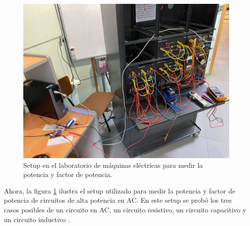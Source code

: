 \begin{figure}[h]
    \centering
    \includegraphics[width=\textwidth]{Imagenes/Circuito_completo.jpg}
    \caption{Setup en el laboratorio de máquinas eléctricas para medir la potencia y factor de potencia.}
    \label{setup-watt}
\end{figure}
\FloatBarrier

Ahora, la figura \ref{setup-watt} ilustra el setup utilizado para medir la potencia y factor de potencia de circuitos de alta potencia en AC. En este setup se probó los tres casos posibles de un circuito en AC, un circuito resistivo, un circuito capacitivo y un circuito inductivo \cite{hayt}.

